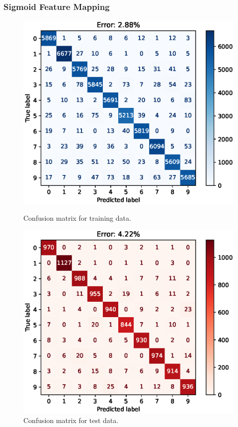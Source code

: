 \documentclass{article}
\begin{document}
\FloatBarrier
\subsubsection{Sigmoid Feature Mapping}
\begin{figure}[h!]
    \centering
    \begin{minipage}{0.5\textwidth}
        \centering
        \includegraphics[width=\textwidth]{images/one_vs_one_training_confusion_matrix_Sigmoid.eps}
        \caption{Confusion matrix for training data.}
    \end{minipage}\hfill
    \begin{minipage}{0.5\textwidth}
        \centering
        \includegraphics[width=\textwidth]{images/one_vs_one_test_confusion_matrix_Sigmoid.eps}
        \caption{Confusion matrix for test data.}
    \end{minipage}
\end{figure}
\end{document}
